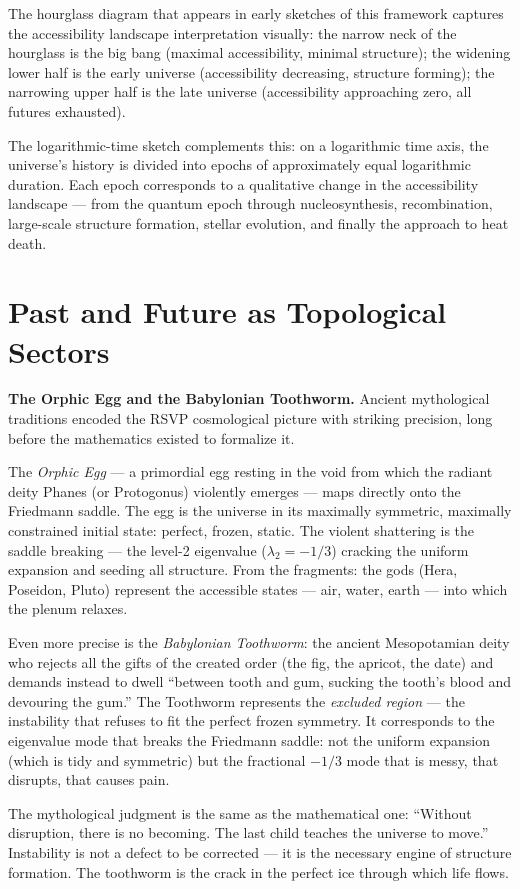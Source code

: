 The hourglass diagram that appears in early sketches of this framework
captures the accessibility landscape interpretation visually: the narrow
neck of the hourglass is the big bang (maximal accessibility, minimal
structure); the widening lower half is the early universe (accessibility
decreasing, structure forming); the narrowing upper half is the
late universe (accessibility approaching zero, all futures exhausted).

The logarithmic-time sketch complements this: on a logarithmic time
axis, the universe's history is divided into epochs of approximately
equal logarithmic duration. Each epoch corresponds to a qualitative
change in the accessibility landscape — from the quantum epoch through
nucleosynthesis, recombination, large-scale structure formation,
stellar evolution, and finally the approach to heat death.

\section{Past and Future as Topological Sectors}

\begin{historynote}
\textbf{The Orphic Egg and the Babylonian Toothworm.}
Ancient mythological traditions encoded the RSVP cosmological picture
with striking precision, long before the mathematics existed to formalize it.

The \emph{Orphic Egg} — a primordial egg resting in the void from which
the radiant deity Phanes (or Protogonus) violently emerges — maps
directly onto the Friedmann saddle. The egg is the universe in its
maximally symmetric, maximally constrained initial state: perfect,
frozen, static. The violent shattering is the saddle breaking —
the level-2 eigenvalue ($\lambda_2 = -1/3$) cracking the uniform
expansion and seeding all structure. From the fragments: the gods
(Hera, Poseidon, Pluto) represent the accessible states — air, water,
earth — into which the plenum relaxes.

Even more precise is the \emph{Babylonian Toothworm}: the ancient
Mesopotamian deity who rejects all the gifts of the created order
(the fig, the apricot, the date) and demands instead to dwell
``between tooth and gum, sucking the tooth's blood and devouring the gum.''
The Toothworm represents the \emph{excluded region} — the instability
that refuses to fit the perfect frozen symmetry. It corresponds to
the eigenvalue mode that breaks the Friedmann saddle: not the
uniform expansion (which is tidy and symmetric) but the fractional
$-1/3$ mode that is messy, that disrupts, that causes pain.

The mythological judgment is the same as the mathematical one:
``Without disruption, there is no becoming. The last child teaches the
universe to move.'' Instability is not a defect to be corrected —
it is the necessary engine of structure formation. The toothworm is the
crack in the perfect ice through which life flows.
\end{historynote}


